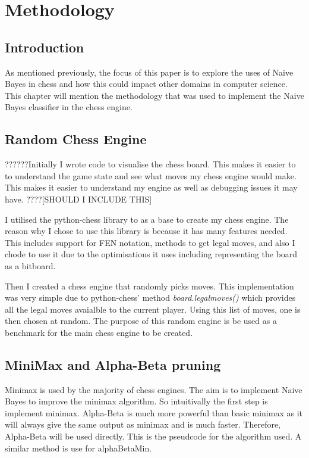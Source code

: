 \chapter{Methodology}

\section{Introduction}
As mentioned previously, the focus of this paper is to explore the uses of Naive Bayes in chess and how this could impact other domains in computer science. This chapter will mention the methodology that was used to implement the Naive Bayes classifier in the chess engine. 

\section{Random Chess Engine}
??????Initially I wrote code to visualise the chess board. This makes it easier to to understand the game state and see what moves my chess engine would make. This makes it easier to understand my engine as well as debugging issues it may have. ????[SHOULD I INCLUDE THIS]

I utilised the python-chess library to as a base to create my chess engine. The reason why I chose to use this library is because it has many features needed. This includes support for FEN notation, methods to get legal moves, and also I chode to use it due to the optimisations it uses including representing the board as a bitboard.

Then I created a chess engine that randomly picks moves. This implementation was very simple due to python-chess' method \textit{board.legalmoves()} which provides all the legal moves avaialble to the current player. Using this list of moves, one is then chosen at random. The purpose of this random engine is be used as a benchmark for the main chess engine to be created.

\section{MiniMax and Alpha-Beta pruning}
Minimax is used by the majority of chess engines. The aim is to implement Naive Bayes to improve the minimax algorithm. So intuitivally the first step is implement minimax. Alpha-Beta is much more powerful than basic minimax as it will always give the same output as minimax and is much faster. Therefore, Alpha-Beta will be used directly. This is the pseudcode for the algorithm used. A similar method is use for alphaBetaMin.

